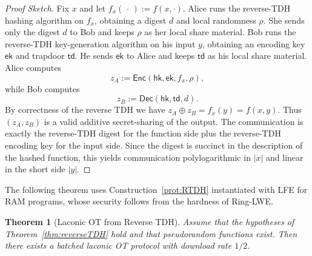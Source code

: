 \documentclass{article}
\newtheorem{theorem}{Theorem}\newtheorem{lemma}[theorem]{Lemma}\newtheorem{proposition}[theorem]{Proposition}\newtheorem{corollary}[theorem]{Corollary}\newtheorem{definition}[theorem]{Definition}\newtheorem{claim}[theorem]{Claim}
\newcommand{\algofont}[1]{\ensuremath{\mathsf{#1}}}
\newcommand{\Enc}{{\algofont{Enc}}}
\newcommand{\Dec}{{\algofont{Dec}}}
\begin{document}
{\begin{proof}[Proof Sketch]
    Fix $x$ and let $f_x(\,\cdot\,) := f(x,\cdot)$. Alice runs the reverse-TDH hashing algorithm on $f_x$, obtaining a digest $d$ and local randomness $\rho$.  She sends only the digest $d$ to Bob and keeps $\rho$ as her local share material. Bob runs the reverse-TDH key-generation algorithm on his input $y$, obtaining an encoding key $\mathsf{ek}$ and trapdoor $\mathsf{td}$. He sends $\mathsf{ek}$ to Alice and keeps $\mathsf{td}$ as his local share material.
Alice computes
\[
z_A := \Enc(\mathsf{hk},\mathsf{ek},f_x,\rho),
\]
while Bob computes
\[
z_B := \Dec(\mathsf{hk},\mathsf{td},d).
\]
By correctness of the reverse TDH we have $z_A \oplus z_B = f_x(y) = f(x,y)$.
Thus $(z_A,z_B)$ is a valid additive secret-sharing of the output.
The communication is exactly the reverse-TDH digest for the function side plus
the reverse-TDH encoding key for the input side.  Since the digest is succinct in
the description of the hashed function, this yields communication polylogarithmic in $|x|$ and linear in the short side $|y|$.
\end{proof}}
%
{The following theorem uses  Construction~\ref{prot:RTDH} instantiated with LFE for RAM programs, whose security follows from the hardness of Ring-LWE.}

{\begin{theorem}[Laconic OT from Reverse TDH]
Assume that the hypotheses of Theorem~\ref{thm:reverseTDH} hold and that pseudorandom functions exist. Then there exists a batched laconic OT protocol with download rate $1/2$.
\end{theorem}}
\end{document}
